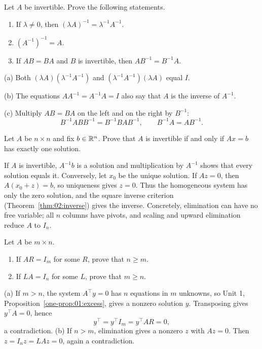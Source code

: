 \begin{problem}\label{ex:02:inverse-identities}
Let $A$ be invertible. Prove the following statements.
\begin{enumerate}
\item If $\lambda\ne0$, then $(\lambda A)^{-1}=\lambda^{-1}A^{-1}$.
\item $(A^{-1})^{-1}=A$.
\item If $AB=BA$ and $B$ is invertible, then $AB^{-1}=B^{-1}A$.
\end{enumerate}
\end{problem}
\begin{solution}
(a) Both $(\lambda A)(\lambda^{-1}A^{-1})$ and
$(\lambda^{-1}A^{-1})(\lambda A)$ equal $I$.
\par (b) The equations $AA^{-1}=A^{-1}A=I$ also say that $A$ is the inverse of $A^{-1}$.
\par (c) Multiply $AB=BA$ on the left and on the right by $B^{-1}$:
\[
B^{-1}ABB^{-1}=B^{-1}BAB^{-1},\qquad B^{-1}A=AB^{-1}.
\]
\end{solution}

\begin{problem}\label{ex:02:bapat-2-13}
Let $A$ be $n\times n$ and fix $b\in\mathbb R^n$. Prove that $A$ is invertible
if and only if $Ax=b$ has exactly one solution.
\end{problem}
\begin{solution}
If $A$ is invertible, $A^{-1}b$ is a solution and multiplication by $A^{-1}$
shows that every solution equals it.
Conversely, let $x_0$ be the unique solution. If $Az=0$, then
$A(x_0+z)=b$, so uniqueness gives $z=0$.
Thus the homogeneous system has only the zero solution, and the square inverse
criterion (Theorem~\ref{thm:02:inverse}) gives the inverse. Concretely, elimination can have no free variable;
all $n$ columns have pivots, and scaling and upward elimination reduce $A$ to $I_n$.
\end{solution}

\begin{problem}\label{ex:02:rectangular-inverses}
Let $A$ be $m\times n$.
\begin{enumerate}
\item If $AR=I_m$ for some $R$, prove that $n\geqslant m$.
\item If $LA=I_n$ for some $L$, prove that $m\geqslant n$.
\end{enumerate}
\end{problem}
\begin{solution}
(a) If $m>n$, the system $A^\top y=0$ has $n$ equations in $m$ unknowns,
so Unit 1, Proposition~\ref{one-prop:01:excess}, gives a nonzero solution $y$.
Transposing gives $y^\top A=0$, hence
\[
y^\top=y^\top I_m=y^\top AR=0,
\]
a contradiction.
(b) If $n>m$, elimination gives a nonzero $z$ with $Az=0$.
Then $z=I_nz=LAz=0$, again a contradiction.
\end{solution}

